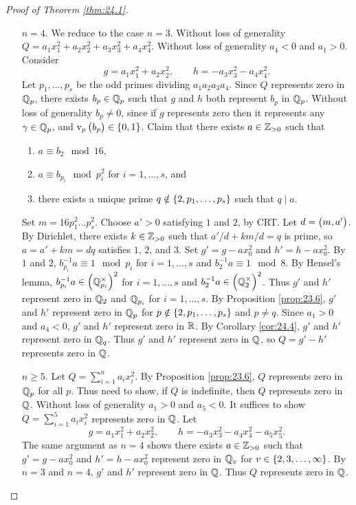 \begin{proof}[Proof of Theorem \ref{thm:24.1}]
\begin{itemize}
\begin{itemize}[leftmargin=0.5in]
\pagebreak

\item[$ n = 4 $.] We reduce to the case $ n = 3 $. Without loss of generality $ Q = a_1x_1^2 + a_2x_2^2 + a_3x_3^2 + a_4x_4^2 $. Without loss of generality $ a_4 < 0 $ and $ a_1 > 0 $. Consider
$$ g = a_1x_1^2 + a_2x_2^2, \qquad h = -a_3x_3^2 - a_4x_4^2. $$
Let $ p_1, \dots, p_s $ be the odd primes dividing $ a_1a_2a_3a_4 $. Since $ Q $ represents zero in $ \mathbb{Q}_p $, there exists $ b_p \in \mathbb{Q}_p $ such that $ g $ and $ h $ both represent $ b_p $ in $ \mathbb{Q}_p $. Without loss of generality $ b_p \ne 0 $, since if $ g $ represents zero then it represents any $ \gamma \in \mathbb{Q}_p $, and $ \v_p\br{b_p} \in \cbr{0, 1} $. Claim that there exists $ a \in \mathbb{Z}_{> 0} $ such that
\begin{enumerate}
\item $ a \equiv b_2 \mod 16 $,
\item $ a \equiv b_{p_i} \mod p_i^2 $ for $ i = 1, \dots, s $, and
\item there exists a unique prime $ q \notin \cbr{2, p_1, \dots, p_s} $ such that $ q \mid a $.
\end{enumerate}
Set $ m = 16p_1^2 \dots p_s^2 $. Choose $ a' > 0 $ satisfying $ 1 $ and $ 2 $, by CRT. Let $ d = \br{m, a'} $. By Dirichlet, there exists $ k \in \mathbb{Z}_{> 0} $ such that $ a' / d + km / d = q $ is prime, so $ a = a' + km = dq $ satisfies $ 1 $, $ 2 $, and $ 3 $. Set $ g' = g - ax_0^2 $ and $ h' = h - ax_0^2 $. By $ 1 $ and $ 2 $, $ b_{p_i}^{-1}a \equiv 1 \mod p_i $ for $ i = 1, \dots, s $ and $ b_2^{-1}a \equiv 1 \mod 8 $. By Hensel's lemma, $ b_{p_i}^{-1}a \in \br{\QQ_{p_i}^\times}^2 $ for $ i = 1, \dots, s $ and $ b_2^{-1}a \in \br{\QQ_2^\times}^2 $. Thus $ g' $ and $ h' $ represent zero in $ \mathbb{Q}_2 $ and $ \mathbb{Q}_{p_i} $ for $ i = 1, \dots, s $. By Proposition \ref{prop:23.6}, $ g' $ and $ h' $ represent zero in $ \mathbb{Q}_p $ for $ p \notin \cbr{2, p_1, \dots, p_s} $ and $ p \ne q $. Since $ a_1 > 0 $ and $ a_4 < 0 $, $ g' $ and $ h' $ represent zero in $ \mathbb{R} $. By Corollary \ref{cor:24.4}, $ g' $ and $ h' $ represent zero in $ \mathbb{Q}_q $. Thus $ g' $ and $ h' $ represent zero in $ \mathbb{Q} $, so $ Q = g' - h' $ represents zero in $ \mathbb{Q} $.
\item[$ n \ge 5 $.] Let $ Q = \sum_{i = 1}^n a_ix_i^2 $. By Proposition \ref{prop:23.6}, $ Q $ represents zero in $ \mathbb{Q}_p $ for all $ p $. Thus need to show, if $ Q $ is indefinite, then $ Q $ represents zero in $ \mathbb{Q} $. Without loss of generality $ a_1 > 0 $ and $ a_5 < 0 $. It suffices to show $ Q = \sum_{i = 1}^5 a_ix_i^2 $ represents zero in $ \mathbb{Q} $. Let
$$ g = a_1x_1^2 + a_2x_2^2, \qquad h = -a_3x_3^2 - a_4x_4^2 - a_5x_5^2. $$
The same argument as $ n = 4 $ shows there exists $ a \in \mathbb{Z}_{> 0} $ such that $ g' = g - ax_0^2 $ and $ h' = h - ax_0^2 $ represent zero in $ \mathbb{Q}_v $ for $ v \in \cbr{2, 3, \dots, \infty} $. By $ n = 3 $ and $ n = 4 $, $ g' $ and $ h' $ represent zero in $ \mathbb{Q} $. Thus $ Q $ represents zero in $ \mathbb{Q} $.
\end{itemize}
\end{itemize}
\end{proof}

